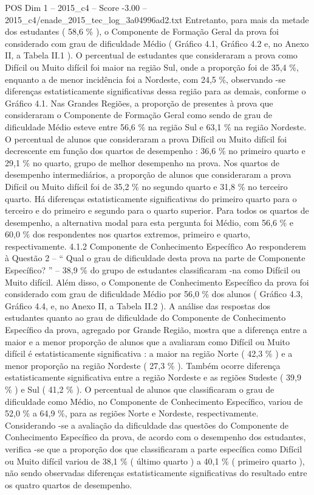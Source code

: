\begin{textsample}{POS Dim 1 – 2015\_c4 – Score -3.00 – 2015\_c4/enade\_2015\_tec\_log\_3a04996ad2.txt}
Entretanto, para mais da metade dos estudantes ( 58,6 \% ), o Componente de Formação Geral da prova foi considerado com grau de dificuldade Médio ( Gráfico 4.1, Gráfico 4.2 e, no Anexo II, a Tabela II.1 ).
O percentual de estudantes que consideraram a prova como Difícil ou Muito difícil foi maior na região Sul, onde a proporção foi de 35,4 \%, enquanto a de menor incidência foi a Nordeste, com 24,5 \%, observando -se diferenças estatisticamente significativas dessa região para as demais, conforme o Gráfico 4.1.
Nas Grandes Regiões, a proporção de presentes à prova que consideraram o Componente de Formação Geral como sendo de grau de dificuldade Médio esteve entre 56,6 \% na região Sul e 63,1 \% na região Nordeste.
O percentual de alunos que consideraram a prova Difícil ou Muito difícil foi decrescente em função dos quartos de desempenho : 36,6 \% no primeiro quarto e 29,1 \% no quarto, grupo de melhor desempenho na prova.
Nos quartos de desempenho intermediários, a proporção de alunos que consideraram a prova Difícil ou Muito difícil foi de 35,2 \% no segundo quarto e 31,8 \% no terceiro quarto.
Há diferenças estatisticamente significativas do primeiro quarto para o terceiro e do primeiro e segundo para o quarto superior.
Para todos os quartos de desempenho, a alternativa modal para esta pergunta foi Médio, com 56,6 \% e 60,0 \% dos respondentes nos quartos extremos, primeiro e quarto, respectivamente. 4.1.2 Componente de Conhecimento Específico Ao responderem à Questão 2 – “ Qual o grau de dificuldade desta prova na parte de Componente Específico? ” – 38,9 \% do grupo de estudantes classificaram -na como Difícil ou Muito difícil.
Além disso, o Componente de Conhecimento Específico da prova foi considerado com grau de dificuldade Médio por 56,0 \% dos alunos ( Gráfico 4.3, Gráfico 4.4, e, no Anexo II, a Tabela II.2 ).
A análise das respostas dos estudantes quanto ao grau de dificuldade do Componente de Conhecimento Específico da prova, agregado por Grande Região, mostra que a diferença entre a maior e a menor proporção de alunos que a avaliaram como Difícil ou Muito difícil é estatisticamente significativa : a maior na região Norte ( 42,3 \% ) e a menor proporção na região Nordeste ( 27,3 \% ).
Também ocorre diferença estatisticamente significativa entre a região Nordeste e as regiões Sudeste ( 39,9 \% ) e Sul ( 41,2 \% ).
O percentual de alunos que classificaram o grau de dificuldade como Médio, no Componente de Conhecimento Específico, variou de 52,0 \% a 64,9 \%, para as regiões Norte e Nordeste, respectivamente.
Considerando -se a avaliação da dificuldade das questões do Componente de Conhecimento Específico da prova, de acordo com o desempenho dos estudantes, verifica -se que a proporção dos que classificaram a parte específica como Difícil ou Muito difícil variou de 38,1 \% ( último quarto ) a 40,1 \% ( primeiro quarto ), não sendo observadas diferenças estatisticamente significativas do resultado entre os quatro quartos de desempenho.

\end{textsample}
